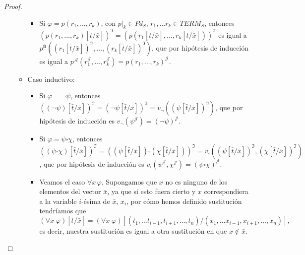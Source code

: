 \begin{proof}
\begin{enumerate}
\begin{itemize}
\begin{itemize}
                    \item Si $\varphi = p(r_1, \dots, r_k)$, con $p|_k \in Pd_S$, $r_1, \dots r_k \in TERM_S$, entonces $(p(r_1, \dots, r_k)[\bar{t}/\bar{x}])^{\mathfrak{I}} = (p(r_1[\bar{t}/\bar{x}], \dots, r_k[\bar{t}/\bar{x}]))^{\mathfrak{I}}$ es igual a  $p^{\mathfrak{A}}((r_1[\bar{t}/\bar{x}])^{\mathfrak{I}}, \dots, (r_k[\bar{t}/\bar{x}])^{\mathfrak{I}})$, que por hipótesis de inducción es igual a $p^{\mathcal{A}}(r_1^{\mathcal{J}}, \dots, r_k^{\mathcal{J}}) = p(r_1, \dots, r_k)^{\mathcal{J}}$.
                \end{itemize}
            \item Caso inductivo:
                    \begin{itemize}
                        \item Si $\varphi = \neg \psi$, entonces $((\neg \psi)[\bar{t}/\bar{x}])^{\mathfrak{I}} = (\neg \psi[\bar{t}/\bar{x}])^{\mathfrak{I}} = v_{\neg}((\psi[\bar{t}/\bar{x}])^{\mathfrak{I}})$, que por hipótesis de inducción es $v_{\neg}(\psi^{\mathcal{J}}) = (\neg \psi)^{\mathcal{J}}$.
                        \item Si $\varphi = \psi \square \chi$, entonces $((\psi \square \chi)[\bar{t}/\bar{x}])^{\mathfrak{I}} = ((\psi[\bar{t}/\bar{x}]) \square (\chi[\bar{t}/\bar{x}]))^{\mathfrak{I}} = v_{\square}((\psi[\bar{t}/\bar{x}])^{\mathfrak{I}}, (\chi[\bar{t}/\bar{x}])^{\mathfrak{I}})$, que por hipótesis de inducción es $v_{\square}(\psi^{\mathcal{J}}, \chi^{\mathcal{J}}) = (\psi \square \chi)^{\mathcal{J}}$.
                        \item Veamos el caso $\forall x \, \varphi$. Supongamos que $x$ no es ninguno de los elementos del vector $\bar{x}$, ya que si esto fuera cierto y $x$ correspondiera a la variable $i$-ésima de $\bar{x}$, $x_i$, por cómo hemos definido sustitución tendríamos que 
                        $$(\forall x\;\varphi)[\bar{t}/\bar{x}]=(\forall x\;\varphi)[(t_1,\dots t_{i-1},t_{i+1},\dots,t_n)/(x_1,\dots x_{i-1},x_{i+1},\dots,x_n)],$$
                        es decir, nuestra sustitución es igual a otra sustitución en que $x\notin\bar{x}$.
    

\end{itemize}
\end{itemize}
\end{enumerate}
\end{proof}
